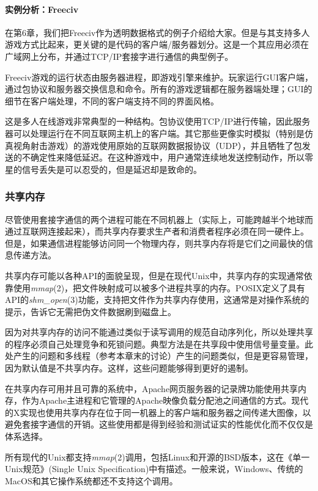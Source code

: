 \documentclass[12pt,oneside]{ctexbook}
\begin{document}
\begin{common-format}
\paragraph{实例分析：Freeciv}
在第6章，我们把Freeciv作为透明数据格式的例子介绍给大家。但是与其支持多人游戏方式比起来，更关键的是代码的客户端/服务器划分。这是一个其应用必须在广域网上分布，并通过TCP/IP套接字进行通信的典型例子。

Freeciv游戏的运行状态由服务器进程，即游戏引擎来维护。玩家运行GUI客户端，通过包协议和服务器交换信息和命令。所有的游戏逻辑都在服务器端处理；GUI的细节在客户端处理，不同的客户端支持不同的界面风格。

这是多人在线游戏非常典型的一种结构。包协议使用TCP/IP进行传输，因此服务器可以处理运行在不同互联网主机上的客户端。其它那些更像实时模拟（特别是仿真视角射击游戏）的游戏使用原始的互联网数据报协议（UDP），并且牺牲了包发送的不确定性来降低延迟。在这种游戏中，用户通常连续地发送控制动作，所以零星的信号丢失是可以忍受的，但是延迟却是致命的。


\subsubsection{共享内存}
尽管使用套接字通信的两个进程可能在不同机器上（实际上，可能跨越半个地球而通过互联网连接起来），而共享内存要求生产者和消费者程序必须在同一硬件上。但是，如果通信进程能够访问同一个物理内存，则共享内存将是它们之间最快的信息传递方法。

共享内存可能以各种API的面貌呈现，但是在现代Unix中，共享内存的实现通常依靠使用\textit{mmap}(2)，把文件映射成可以被多个进程共享的内存。POSIX定义了具有API的\textit{shm\_{}open}(3)功能，支持把文件作为共享内存使用，这通常是对操作系统的提示，告诉它无需把伪文件数据刷到磁盘上。

因为对共享内存的访问不能通过类似于读写调用的规范自动序列化，所以处理共享的程序必须自己处理竞争和死锁问题。典型方法是在共享段中使用信号量变量。此处产生的问题和多线程（参考本章末的讨论）产生的问题类似，但是更容易管理，因为默认值是不共享内存。这样，这些问题能够得到更好的遏制。

在共享内存可用并且可靠的系统中，Apache网页服务器的记录牌功能使用共享内存，作为Apache主进程和它管理的Apache映像负载分配池之间通信的方式。现代的X实现也使用共享内存在位于同一机器上的客户端和服务器之间传递大图像，以避免套接字通信的开销。这些使用都是得到经验和测试证实的性能优化而不仅仅是体系选择。

所有现代的Unix都支持\textit{mmap}(2)调用，包括Linux和开源的BSD版本，这在《单一Unix规范》(Single Unix Specification)中有描述。一般来说，Windows、传统的MacOS和其它操作系统都还不支持这个调用。


\end{common-format}
\end{document}
